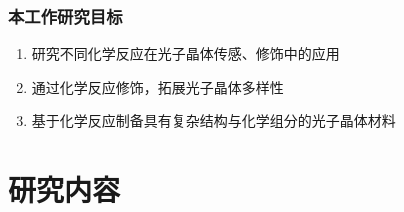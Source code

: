 \documentclass{beamer}
\begin{document}
\begin{frame}
  \frametitle{本工作研究目标}
  \begin{enumerate}[<+-| alert@+>]
    \item
     研究不同化学反应在光子晶体传感、修饰中的应用
    \item
     通过化学反应修饰，拓展光子晶体多样性
    \item
     基于化学反应制备具有复杂结构与化学组分的光子晶体材料
  \end{enumerate}
\end{frame}

\section{研究内容}



\end{document}
